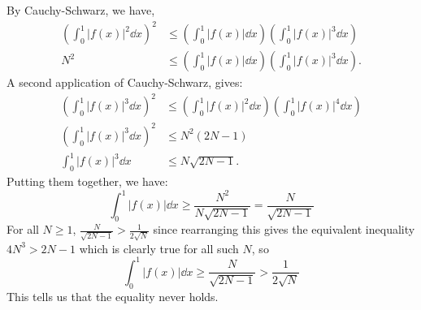 \documentclass{amsart}
\begin{document}
\noindent
By Cauchy-Schwarz, we have,
\begin{align*}
    \left(\int_0^1 |f(x)|^2 \dd{x}\right)^2 &\le \left(\int_0^1 |f(x)| \dd{x}\right) \left(\int_0^1 |f(x)|^3 \dd{x}\right) \\
    N^2                                     &\le \left(\int_0^1 |f(x)| \dd{x}\right) \left(\int_0^1 |f(x)|^3 \dd{x}\right).
\end{align*}
A second application of Cauchy-Schwarz, gives:
\begin{align*}
    \left(\int_0^1 |f(x)|^3 \dd{x}\right)^2 &\le \left(\int_0^1 |f(x)|^2 \dd{x}\right) \left(\int_0^1 |f(x)|^4 \dd{x}\right) \\
    \left(\int_0^1 |f(x)|^3 \dd{x}\right)^2 &\le N^2(2N-1) \\
    \int_0^1 |f(x)|^3 \dd{x} &\le N\sqrt{2N - 1}.
\end{align*}
Putting them together, we have:
\begin{equation*}
    \int_0^1 |f(x)| \dd{x} \ge \frac{N^2}{N\sqrt{2N-1}} = \frac{N}{\sqrt{2N-1}}
\end{equation*}
For all $N \ge 1$, $\frac{N}{\sqrt{2N-1}} > \frac{1}{2\sqrt{N}}$ since rearranging this gives the equivalent inequality $4N^3 > 2N - 1$ which is clearly true for all such $N$, so
\begin{equation*}
    \int_0^1 |f(x)| \dd{x} \ge \frac{N}{\sqrt{2N-1}} > \frac{1}{2\sqrt{N}}
\end{equation*}
\bigskip\noindent
This tells us that the equality never holds.
\end{document}
